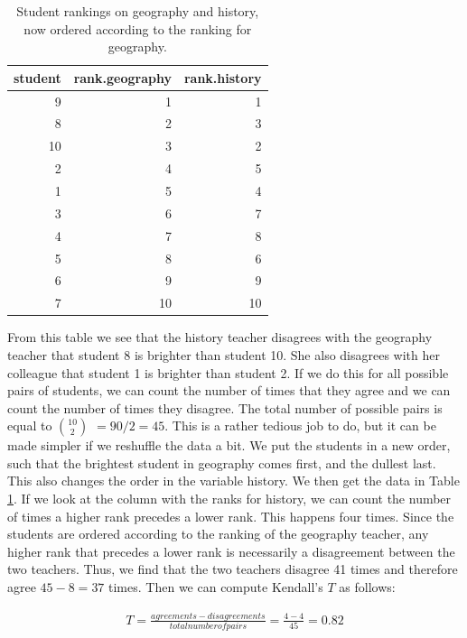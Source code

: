 \documentclass[]{book}\usepackage[]{graphicx}\usepackage[]{color}
\begin{document}
\begin{table}[ht]
\centering
\caption{Student rankings on geography and history, now ordered according to the ranking for geography.} 
\label{tab:nonpar_7}
\begin{tabular}{rrr}
  \hline
student & rank.geography & rank.history \\ 
  \hline
9 & 1 & 1 \\ 
  8 & 2 & 3 \\ 
  10 & 3 & 2 \\ 
  2 & 4 & 5 \\ 
  1 & 5 & 4 \\ 
  3 & 6 & 7 \\ 
  4 & 7 & 8 \\ 
  5 & 8 & 6 \\ 
  6 & 9 & 9 \\ 
  7 & 10 & 10 \\ 
   \hline
\end{tabular}
\end{table}


From this table we see that the history teacher disagrees with the geography teacher that student 8 is brighter than student 10. She also disagrees with her colleague that student 1 is brighter than student 2. If we do this for all possible pairs of students, we can count the number of times that they agree and we can count the number of times they disagree. The total number of possible pairs is equal to $10 \choose 2 $ $ = 90/2= 45$. This is a rather tedious job to do, but it can be made simpler if we reshuffle the data a bit. We put the students in a new order, such that the brightest student in geography comes first, and the dullest last. This also changes the order in the variable history. We then get the data in Table \ref{tab:nonpar_7}. If we look at the column with the ranks for history, we can count the number of times a higher rank precedes a lower rank. This happens four times. Since the students are ordered according to the ranking of the geography teacher, any higher rank that precedes a lower rank is necessarily a disagreement between the two teachers. Thus, we find that the two teachers disagree 41 times and therefore agree $45-8=37$ times. Then we can compute Kendall's $T$ as follows:
 
  \begin{eqnarray}
  T= \frac { agreements - disagreements }{total number of pairs} = \frac{4-4 }{45} = 0.82
  \end{eqnarray}
\end{document}
